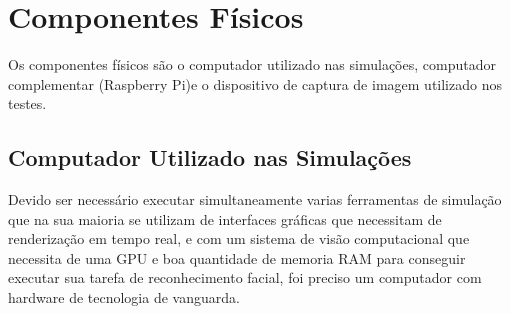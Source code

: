 \section{Componentes Físicos}

Os componentes físicos são o computador utilizado nas simulações, computador complementar (Raspberry Pi)e o dispositivo de captura de imagem utilizado nos testes.

\subsection{Computador Utilizado nas Simulações}
\label{subsec:compsim}

Devido ser necessário executar simultaneamente varias ferramentas de simulação que na sua maioria se utilizam de interfaces gráficas que necessitam de renderização em tempo real, e com um sistema de visão computacional que necessita de uma GPU e boa quantidade de memoria RAM para conseguir executar sua tarefa de reconhecimento facial, foi preciso um computador com hardware de tecnologia de vanguarda.

